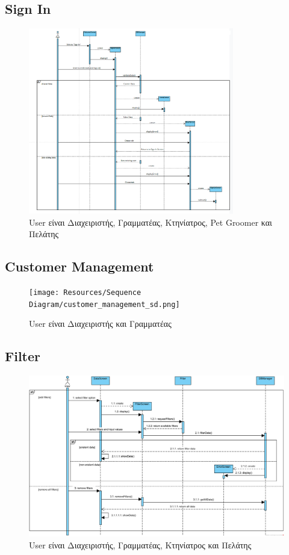 \documentclass[12pt,a4paper,twoside]{book}
\begin{document}
\subsection{Sign In}
\begin{figure}[H]
    \centering
    \includegraphics[width=0.8\textwidth]{Resources/Sequence Diagram/Sign_In_SD.png}
    \caption{User είναι Διαχειριστής, Γραμματέας, Κτηνίατρος, Pet Groomer και Πελάτης}\label{fig:sequence-signin}
\end{figure}

\subsection{Customer Management}
\begin{figure}[H]
    \centering
    \texttt{[image: Resources/Sequence Diagram/customer\_management\_sd.png]}
    \caption{User είναι Διαχειριστής και Γραμματέας}\label{fig:sequence-customer-management}
\end{figure}

\subsection{Filter}
\begin{figure}[H]
    \centering
    \includegraphics[width=\textwidth]{Resources/Sequence Diagram/filter_sd.png}
    \caption{User είναι Διαχειριστής, Γραμματέας, Κτηνίατρος και Πελάτης}\label{fig:sequence-filter}
\end{figure}
\end{document}
